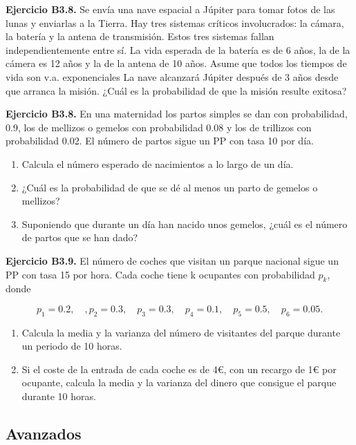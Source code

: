 \documentclass[
]{book}
\providecommand{\tightlist}{%
  \setlength{\itemsep}{0pt}\setlength{\parskip}{0pt}}
\theoremstyle{definition}
\theoremstyle{definition}
\theoremstyle{definition}
\theoremstyle{definition}
\theoremstyle{remark}
\begin{document}
\textbf{Ejercicio B3.8.} Se envía una nave espacial a Júpiter para tomar fotos de las lunas y enviarlas a la Tierra. Hay tres sistemas críticos involucrados: la cámara, la batería y la antena de transmisión. Estos tres sistemas fallan independientemente entre sí. La vida esperada de la batería es de 6 años, la de la cámera es 12 años y la de la antena de 10 años. Asume que todos los tiempos de vida son v.a. exponenciales La nave alcanzará Júpiter después de 3 años desde que arranca la misión. ¿Cuál es la probabilidad de que la misión resulte exitosa?

\textbf{Ejercicio B3.8.} En una maternidad los partos simples se dan con probabilidad, 0.9, los de mellizos o gemelos con probabilidad 0.08 y los de trillizos con probabilidad 0.02. El número de partos sigue un PP con tasa 10 por día.

\begin{enumerate}
\def\labelenumi{\arabic{enumi}.}
\tightlist
\item
  Calcula el número esperado de nacimientos a lo largo de un día.
\item
  ¿Cuál es la probabilidad de que se dé al menos un parto de gemelos o mellizos?
\item
  Suponiendo que durante un día han nacido unos gemelos, ¿cuál es el número de partos que se han dado?
\end{enumerate}

\textbf{Ejercicio B3.9.} El número de coches que visitan un parque nacional sigue un PP con tasa 15 por hora. Cada coche tiene k ocupantes con probabilidad \(p_k\), donde

\[p_1=0.2, \quad, p_2=0.3, \quad p_3=0.3, \quad p_4=0.1, \quad p_5=0.5, \quad p_6=0.05.\]

\begin{enumerate}
\def\labelenumi{\arabic{enumi}.}
\tightlist
\item
  Calcula la media y la varianza del número de visitantes del parque durante un periodo de 10 horas.
\item
  Si el coste de la entrada de cada coche es de 4€, con un recargo de 1€ por ocupante, calcula la media y la varianza del dinero que consigue el parque durante 10 horas.
\end{enumerate}

\hypertarget{avanzados-2}{%
\subsection{Avanzados}\label{avanzados-2}}
\end{document}
